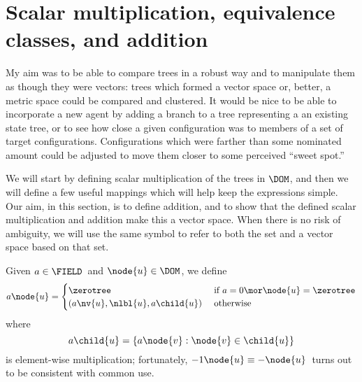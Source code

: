 \section{Scalar multiplication, equivalence classes, and addition}

My aim was to be able to compare trees in a robust way and to
manipulate them as though they were vectors: trees which formed a
vector space or, better, a metric space could be compared and
clustered. It would be nice to be able to incorporate a new agent by
adding a branch to a tree representing a an existing state tree, or to
see how close a given configuration was to members of a set of target
configurations. Configurations which were farther than some nominated
amount could be adjusted to move them closer to some perceived ``sweet
spot.''

We will start by defining scalar multiplication of the trees in
$\DOM$, and then we will define a few useful mappings which will help
keep the expressions simple. Our aim, in this section, is to define
addition, and to show that the defined scalar multiplication and
addition make this a vector space. When there is no risk of ambiguity,
we will use the same symbol to refer to both the set and
a vector space based on that set.

\begin{definition}\label{scalarmultiplication}
  Given $a \in \FIELD$\ and $\node{u} \in \DOM$, we
  define
  \begin{align*}
    a \node{u} = \begin{cases}
      \zerotree  & \text{ if } a = 0 \mor \node{u} = \zerotree \\
      (a \nv{u}, \nlbl{u}, a\child{u}) & \text{ otherwise }
    \end{cases}
  \end{align*}
  where \[a\child{u} = \{a \node{v}: \node{v}\in\child{u}\}\] is
  element-wise multiplication; fortunately,  $-1 \node{u} \equiv
  -\node{u}$\ turns out to be consistent with common use.
\end{definition}

